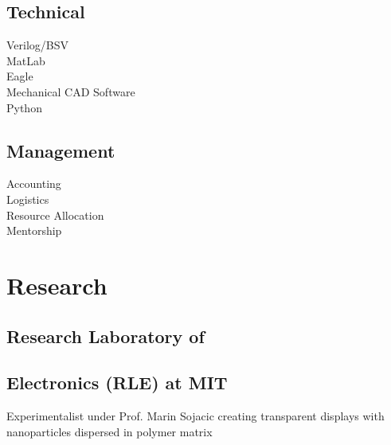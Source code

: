 \documentclass[letterpaper, article]{deedy-resume-openfont}
\begin{document}
\begin{minipage}[t]{0.33\textwidth}
\subsection{Technical}

Verilog/BSV \hspace{2.625cm} \textbullet \textbullet  \textbullet \textbullet \textbullet \\
MatLab \hspace{3.28cm} \textbullet \textbullet \textbullet \textbullet  \textbullet\\
Eagle \hspace{3.63cm} \textbullet \textbullet \textbullet \textbullet \\
Mechanical CAD Software \hspace{.5cm} \textbullet \textbullet  \textbullet \\
Python \hspace{3.37cm}  \textbullet \textbullet  \textbullet \\






\sectionsep

\subsection{Management}
Accounting \hspace{2.75cm} \textbullet \textbullet \textbullet  \textbullet \textbullet\\
Logistics \hspace{3.15cm} \textbullet \textbullet  \textbullet \textbullet \\
Resource Allocation \hspace{1.47cm} \textbullet \textbullet \textbullet \textbullet \\
Mentorship \hspace{2.7cm} \textbullet \textbullet \textbullet  \\



\section{Research}

\subsection{Research Laboratory of \hfill}
\subsection{Electronics (RLE) at MIT \hfill}
Experimentalist under Prof. Marin Sojacic creating transparent displays with nanoparticles dispersed in polymer matrix
\sectionsep

\end{minipage}
\end{document}
